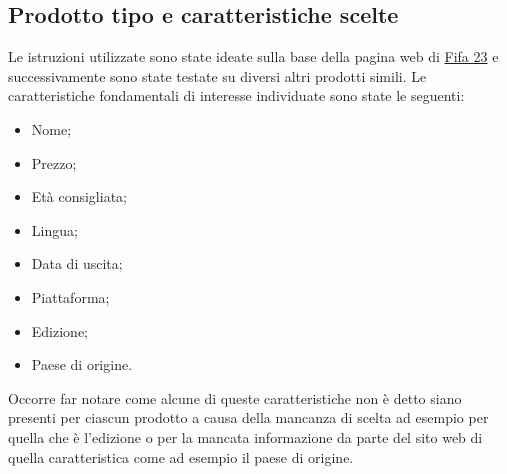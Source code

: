 \documentclass[12pt, letterpaper]{article}
\begin{document}
\subsection{Prodotto tipo e caratteristiche scelte}
Le istruzioni utilizzate sono state ideate sulla base della pagina web di \href{https://www.amazon.it/FIFA-23-Standard-PS4-Italiano/dp/B0B6CKCTXH/ref=sr_1_1?keywords=fifa+23+ps4&qid=1668615637&qu=eyJxc2MiOiIxLjU2IiwicXNhIjoiMC43NSIsInFzcCI6IjAuMzMifQ%3D%3D&sprefix=fifa%2Caps%2C152&sr=8-1}{Fifa 23} e successivamente sono state testate su diversi altri prodotti simili. Le caratteristiche fondamentali di interesse individuate sono state le seguenti:
 \begin{itemize}
 	    \item Nome;
    \item Prezzo;
    \item Età consigliata;
    \item Lingua;
    \item Data di uscita;
    \item Piattaforma;
    \item Edizione;
    \item Paese di origine.
\end{itemize}
Occorre far notare come alcune di queste caratteristiche non è detto siano presenti per ciascun prodotto a causa della mancanza di scelta ad esempio per quella che è l'edizione o per la mancata informazione da parte del sito web di quella caratteristica come ad esempio il paese di origine.
\end{document}
